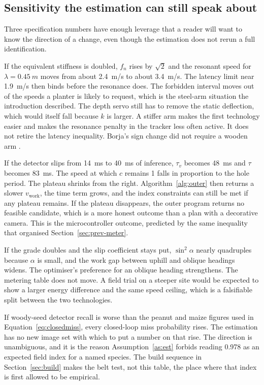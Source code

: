 \subsection{Sensitivity the estimation can still speak about}

Three specification numbers have enough leverage that a reader will want to know the direction of a change, even though the estimation does not rerun a full identification.

If the equivalent stiffness is doubled, \(f_n\) rises by \(\sqrt{2}\) and the resonant speed for \(\lambda=\SI{0.45}{m}\) moves from about \SI{2.4}{m/s} to about \SI{3.4}{m/s}. The latency limit near \SI{1.9}{m/s} then binds before the resonance does. The forbidden interval moves out of the speeds a planter is likely to request, which is the steel-arm situation the introduction described. The depth servo still has to remove the static deflection, which would itself fall because \(k\) is larger. A stiffer arm makes the first technology easier and makes the resonance penalty in the tracker less often active. It does not retire the latency inequality. Borja's sign change did not require a wooden arm \cite{borja2021}.

If the detector slips from \SI{14}{ms} to \SI{40}{ms} of inference, \(\tau_v\) becomes \SI{48}{ms} and \(\tau\) becomes \SI{83}{ms}. The speed at which \(c\) remains \num{1} falls in proportion to the hole period. The plateau shrinks from the right. Algorithm~\ref{alg:outer} then returns a slower \(v_{\mathrm{work}}\), the time term grows, and the index constraints can still be met if any plateau remains. If the plateau disappears, the outer program returns no feasible candidate, which is a more honest outcome than a plan with a decorative camera. This is the microcontroller outcome, predicted by the same inequality that organised Section~\ref{sec:prev-meter}.

If the grade doubles and the slip coefficient stays put, \(\sin^2\alpha\) nearly quadruples because \(\alpha\) is small, and the work gap between uphill and oblique headings widens. The optimiser's preference for an oblique heading strengthens. The metering table does not move. A field trial on a steeper site would be expected to show a larger energy difference and the same speed ceiling, which is a falsifiable split between the two technologies.

If woody-seed detector recall is worse than the peanut and maize figures used in Equation~\eqref{eq:closedmiss}, every closed-loop miss probability rises. The estimation has no new image set with which to put a number on that rise. The direction is unambiguous, and it is the reason Assumption~\ref{as:est} forbids reading \num{0.978} as an expected field index for a named species. The build sequence in Section~\ref{sec:build} makes the belt test, not this table, the place where that index is first allowed to be empirical.

